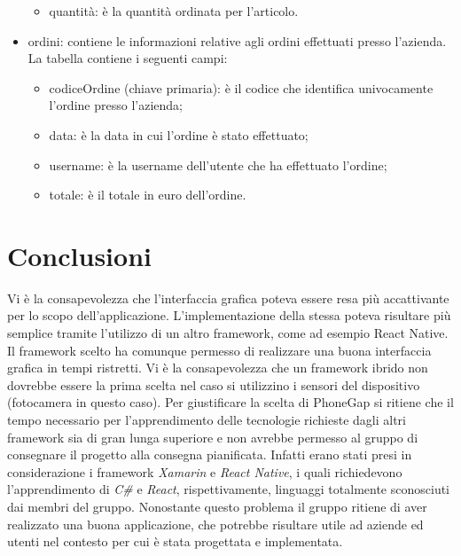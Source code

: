 \documentclass[12pt, a4paper, titlepage]{report}
\begin{document}
\begin{itemize}
\begin{itemize}
			\item quantità: è la quantità ordinata per l'articolo.
		\end{itemize}
		\item ordini: contiene le informazioni relative agli ordini effettuati presso l'azienda. La tabella contiene i seguenti campi:
		\begin{itemize}
			\item codiceOrdine (chiave primaria): è il codice che identifica univocamente l'ordine presso l'azienda;
			\item data: è la data in cui l'ordine è stato effettuato;
			\item username: è la username dell'utente che ha effettuato l'ordine;
			\item totale: è il totale in euro dell'ordine.
		\end{itemize}
	\end{itemize}
	
	\section{Conclusioni}
	Vi è la consapevolezza che l'interfaccia grafica poteva essere resa più accattivante per lo scopo dell'applicazione. L'implementazione della stessa poteva risultare più semplice tramite l'utilizzo di un altro framework, come ad esempio React Native. 
	Il framework scelto ha comunque permesso di realizzare una buona interfaccia grafica in tempi ristretti. Vi è la consapevolezza che un framework ibrido non dovrebbe essere la prima scelta nel caso si utilizzino i sensori del dispositivo (fotocamera in questo caso). Per giustificare la scelta di PhoneGap si ritiene che il tempo necessario per l'apprendimento delle tecnologie richieste dagli altri framework sia di gran lunga superiore e non avrebbe permesso al gruppo di consegnare il progetto alla consegna pianificata. Infatti erano stati presi in considerazione i framework \textit{Xamarin} e \textit{React Native}, i quali richiedevono l'apprendimento di \textit{C#} e \textit{React}, rispettivamente, linguaggi totalmente sconosciuti dai membri del gruppo. Nonostante questo problema il gruppo ritiene di aver realizzato una buona applicazione, che potrebbe risultare utile ad aziende ed utenti nel contesto per cui è stata progettata e implementata.
\end{document}
